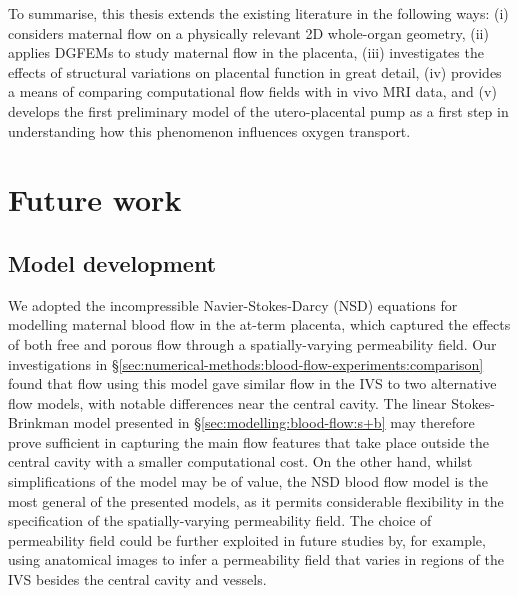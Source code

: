         To summarise, this thesis extends the existing literature in the following ways: (i) considers maternal flow on a physically relevant 2D whole-organ geometry, (ii) applies DGFEMs to study maternal flow in the placenta, (iii) investigates the effects of structural variations on placental function in great detail, (iv) provides a means of comparing computational flow fields with in vivo MRI data, and (v) develops the first preliminary model of the utero-placental pump as a first step in understanding how this phenomenon influences oxygen transport.
        
    \section{Future work}
        \subsection{Model development}        
            We adopted the incompressible Navier-Stokes-Darcy (NSD) equations for modelling maternal blood flow in the at-term placenta, which captured the effects of both free and porous flow through a spatially-varying permeability field. Our investigations in \S\ref{sec:numerical-methods:blood-flow-experiments:comparison} found that flow using this model gave similar flow in the IVS to two alternative flow models, with notable differences near the central cavity. The linear Stokes-Brinkman model presented in \S\ref{sec:modelling:blood-flow:s+b} may therefore prove sufficient in capturing the main flow features that take place outside the central cavity with a smaller computational cost. On the other hand, whilst simplifications of the model may be of value, the NSD blood flow model is the most general of the presented models, as it permits considerable flexibility in the specification of the spatially-varying permeability field. The choice of permeability field could be further exploited in future studies by, for example, using anatomical images to infer a permeability field that varies in regions of the IVS besides the central cavity and vessels.

